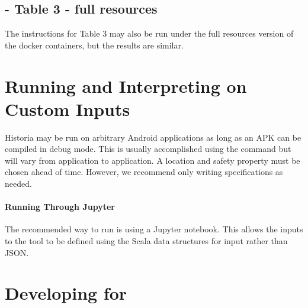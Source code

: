 \documentclass{acmart} %
\begin{document}
\subsection{ - Table 3 - full resources}

The instructions for Table 3 may also be run under the full resources version of the docker containers, but the results are similar.

\iffalse
\section{Running and Interpreting \toolname on Custom Inputs}

Historia may be run on arbitrary Android applications as long as an APK can be compiled in debug mode.  This is usually accomplished using the command  but will vary from application to application. A location and safety property must be chosen ahead of time.  However, we recommend only writing \newls specifications as needed.

\paragraph{Running \toolname Through Jupyter}
The recommended way to run \toolname is using a Jupyter notebook.  This allows the inputs to the tool to be defined using the Scala data structures for input rather than JSON.







\section{Developing for \toolname}
\end{document}
